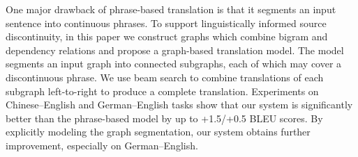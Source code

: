 One major drawback of phrase-based translation is that it segments an input sentence into continuous phrases. To support linguistically informed source discontinuity, in this paper we construct graphs which combine bigram and dependency relations and propose a graph-based translation model. The model segments an input graph into connected subgraphs, each of which may cover a discontinuous phrase. We use beam search to combine translations of each subgraph left-to-right to produce a complete translation. Experiments on Chinese--English and German--English tasks show that our system is significantly better than the phrase-based model by up to +1.5/+0.5 BLEU scores. By explicitly modeling the graph segmentation, our system obtains further improvement, especially on German--English.
